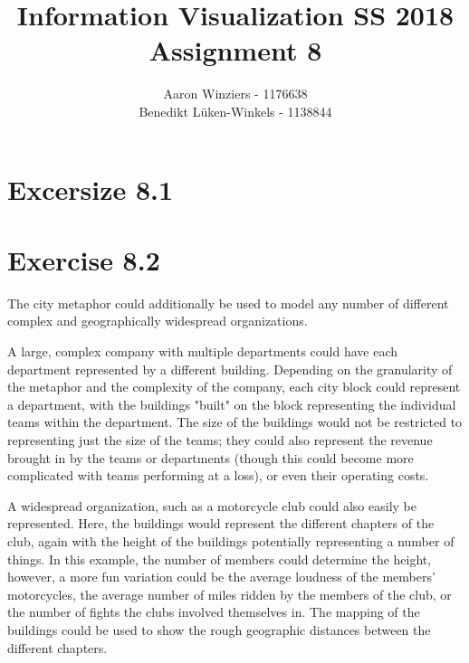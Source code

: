 \documentclass[10pt,a4paper,parskip=quarter ]{article}
\author{Aaron Winziers - 1176638 \\
Benedikt Lüken-Winkels - 1138844}
\title{Information Visualization SS 2018\\\LARGE{Assignment 8}}
\begin{document}
	\maketitle
	\section*{Excersize 8.1}
	
	\section*{Exercise 8.2}
	The city metaphor could additionally be used to model any number of different complex and geographically widespread organizations.
	
	A large, complex company with multiple departments could have each department represented by a different building. Depending on the granularity of the metaphor and the complexity of the company, each city block could represent a department, with the buildings "built" on the block representing the individual teams within the department. The size of the buildings would not be restricted to representing just the size of the teams; they could also represent the revenue brought in by the teams or departments (though this could become more complicated with teams performing at a loss), or even their operating costs.
	
	A widespread organization, such as a motorcycle club could also easily be represented. Here, the buildings would represent the different chapters of the club, again with the height of the buildings potentially representing a number of things. In this example, the number of members could determine the height, however, a more fun variation could be the average loudness of the members' motorcycles, the average number of miles ridden by the members of the club, or the number of fights the clubs involved themselves in. The mapping of the buildings could be used to show the rough geographic distances between the different chapters.
	
\end{document}
